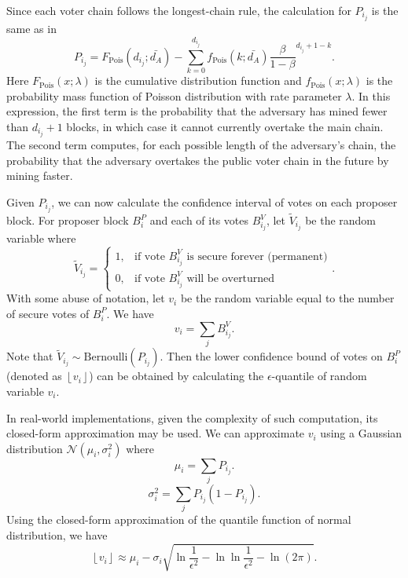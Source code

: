 Since each voter chain follows the longest-chain rule, the calculation for $P_{i_j}$ is the same as in \bitcoin
$$P_{i_j} = F_{\text{Pois}}(d_{i_j};\bar{d_A}) - \sum_{k=0}^{d_{i_j}}f_{\text{Pois}}(k;\bar{d_A})\frac{\beta}{1-\beta}^{d_{i_j} + 1 - k}.$$
Here $F_{\text{Pois}}(x;\lambda)$ is the cumulative distribution function and $f_{\text{Pois}}(x;\lambda)$ is the probability mass function of Poisson distribution with rate parameter $\lambda$.
In this expression, the first term is the probability that the adversary has mined fewer than $d_{i_j}+1$ blocks, in which case it cannot currently overtake the main chain. 
The second term computes, for each possible length of the adversary's chain, the probability that the adversary overtakes the public voter chain in the future by mining faster. 

Given $P_{i_j}$, we can now calculate the confidence interval of votes on each proposer block. For proposer block $B_i^P$ and each of its votes $B^V_{i_j}$, let $\tilde V_{i_j}$ be the random variable where
$$\tilde V_{i_j} = \begin{cases}
    1, & \text{if vote } B^V_{i_j} \text{ is secure forever (permanent)} \\
    0, & \text{if vote } B^V_{i_j} \text{ will be overturned}
  \end{cases}.$$
With some abuse of notation, let $v_i$ be the random variable equal to the number of secure votes of $B^P_i$. We have
$$v_i = \sum_{j}B^V_{i_j}.$$
Note that $\tilde V_{i_j}\sim \text{Bernoulli}(P_{i_j})$. Then the lower confidence bound of votes on $B_i^P$ (denoted as $\left \lfloor v_{i} \right \rfloor$) can be obtained by calculating the $\epsilon$-quantile of random variable $v_i$.

In real-world implementations, given the complexity of such computation, its closed-form approximation may be used. We can approximate $v_i$ using a Gaussian distribution $\mathcal N(\mu_i, \sigma_i^2)$ where
$$\mu_i=\sum_j P_{i_j}.$$
$$\sigma_i^2 = \sum_j P_{i_j}(1-P_{i_j}).$$
Using the closed-form approximation of the quantile function of normal distribution, we have
$$\left \lfloor v_{i} \right \rfloor \approx \mu_i - \sigma_i \sqrt{\ln{
\frac{1}{\epsilon^2}} - \ln{\ln{\frac{1}{\epsilon^2}}} - \ln{(2\pi)}}.$$

